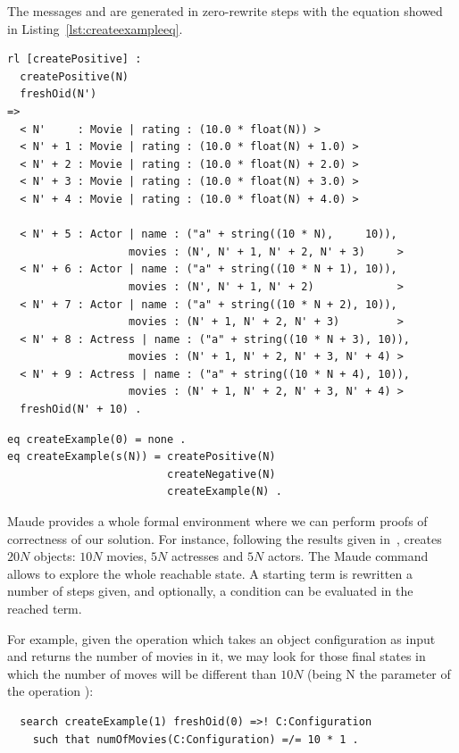 The messages  and  are generated in zero-rewrite steps with the equation showed in Listing~\ref{lst:createexampleeq}.

\begin{lstlisting}[caption=\code{createPositive} Maude rule., label=lst:createPositive]
rl [createPositive] :
  createPositive(N)
  freshOid(N')
=>
  < N'     : Movie | rating : (10.0 * float(N)) >
  < N' + 1 : Movie | rating : (10.0 * float(N) + 1.0) >
  < N' + 2 : Movie | rating : (10.0 * float(N) + 2.0) >
  < N' + 3 : Movie | rating : (10.0 * float(N) + 3.0) >
  < N' + 4 : Movie | rating : (10.0 * float(N) + 4.0) >
  
  < N' + 5 : Actor | name : ("a" + string((10 * N),     10)),
                   movies : (N', N' + 1, N' + 2, N' + 3)     >
  < N' + 6 : Actor | name : ("a" + string((10 * N + 1), 10)),
                   movies : (N', N' + 1, N' + 2)             >
  < N' + 7 : Actor | name : ("a" + string((10 * N + 2), 10)),
                   movies : (N' + 1, N' + 2, N' + 3)         >
  < N' + 8 : Actress | name : ("a" + string((10 * N + 3), 10)),
                   movies : (N' + 1, N' + 2, N' + 3, N' + 4) >
  < N' + 9 : Actress | name : ("a" + string((10 * N + 4), 10)),
                   movies : (N' + 1, N' + 2, N' + 3, N' + 4) >
  freshOid(N' + 10) .
\end{lstlisting}

\begin{lstlisting}[label=lst:createexampleeq, caption=Equation \code{createExample(N:Nat)}.]
eq createExample(0) = none .
eq createExample(s(N)) = createPositive(N)
                         createNegative(N)
                         createExample(N) .
\end{lstlisting}

Maude provides a whole formal environment where we can perform proofs of correctness of our solution. For instance, following the results given in~\cite{imdbcase},  creates $20N$ objects: $10N$ movies, $5N$ actresses and $5N$ actors. The Maude  command allows to explore the whole reachable state. A starting term is rewritten a number of steps given, and optionally, a condition can be evaluated in the reached term.

For example, given the  operation which takes an object configuration as input and returns the number of movies in it, we may look for those final states in which the number of moves will be different than $10N$ (being N the parameter of the operation ):
\begin{verbatim}
  search createExample(1) freshOid(0) =>! C:Configuration
    such that numOfMovies(C:Configuration) =/= 10 * 1 .
\end{verbatim}

